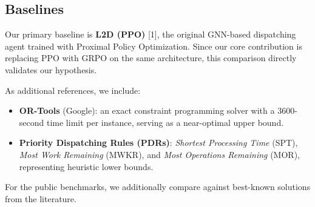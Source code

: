 \documentclass{article}
\begin{document}
\subsection{Baselines}

Our primary baseline is \textbf{L2D (PPO)} [1], the original GNN-based dispatching agent trained with Proximal Policy Optimization. Since our core contribution is replacing PPO with GRPO on the same architecture, this comparison directly validates our hypothesis.

As additional references, we include:
\begin{itemize}
    \item \textbf{OR-Tools} (Google): an exact constraint programming solver with a 3600-second time limit per instance, serving as a near-optimal upper bound.
    \item \textbf{Priority Dispatching Rules (PDRs)}: \textit{Shortest Processing Time} (SPT), \textit{Most Work Remaining} (MWKR), and \textit{Most Operations Remaining} (MOR), representing heuristic lower bounds.
\end{itemize}
For the public benchmarks, we additionally compare against best-known solutions from the literature.

%
%

%
\end{document}
